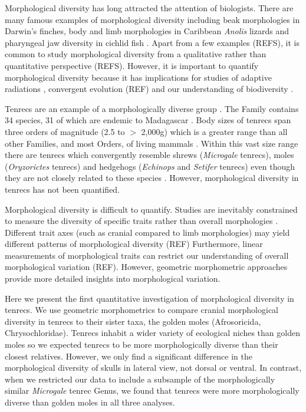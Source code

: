 \documentclass[12pt,a4paper]{article}
\begin{document}
	Morphological diversity has long attracted the attention of biologists. There are many famous examples of morphological diversity including beak morphologies in Darwin's finches, body and limb morphologies in Caribbean \textit{Anolis} lizards and pharyngeal jaw diversity in cichlid fish \citep{Gavrilets2009}. %
	Apart from a few examples (REFS), it is common to study morphological diversity from a qualitative rather than quantitative perspective (REFS). However, it is important to quantify morphological diversity because it has implications for studies of adaptive radiations \citep{Losos2010}, convergent evolution (REF) and our understanding of biodiversity \citep{Roy1997}.
	


	Tenrecs are an example of a morphologically diverse group \citep{Soarimalala2011, Olson2003}. The Family contains 34 species, 31 of which are endemic to Madagascar \citep{Olson2013}. Body sizes of tenrecs span three orders of magnitude (2.5 to $>$ 2,000g) which is a greater range than all other Families, and most Orders, of living mammals \citep{Olson2003}. Within this vast size range there are tenrecs which convergently resemble shrews (\textit{Microgale} tenrecs), moles (\textit{Oryzorictes} tenrecs) and hedgehogs (\textit{Echinops} and \textit{Setifer} tenrecs) \citep{Eisenberg1969} even though they are not closely related to these species \citep{Stanhope1998}. However, morphological diversity in tenrecs has not been quantified.


	Morphological diversity is difficult to quantify. Studies are inevitably constrained to measure the diversity of specific traits rather than overall morphologies \citep{Roy1997}. Different trait axes (such as cranial compared to limb morphologies) may yield different patterns of morphological diversity (REF) %
	Furthermore, linear measurements of morphological traits can restrict our understanding of overall morphological variation (REF). However, geometric morphometric approaches \citep{Rohlf1993, Adams2013} provide more detailed insights into morphological variation.
	 
	Here we present the first quantitative investigation of morphological diversity in tenrecs. We use geometric morphometrics to compare cranial morphological diversity in tenrecs to their sister taxa, the golden moles (Afrosoricida, Chrysochloridae). Tenrecs inhabit a wider variety of ecological niches \citep{Soarimalala2011} than golden moles \citep{Bronner1995} so we expected tenrecs to be more morphologically diverse than their closest relatives. However, we only find a significant difference in the morphological diversity of skulls in lateral view, not dorsal or ventral. In contrast, when we restricted our data to include a subsample of the morphologically similar \textit{Microgale} tenrec Genus, we found that tenrecs were more morphologically diverse than golden moles in all three analyses.
	
\end{document}
